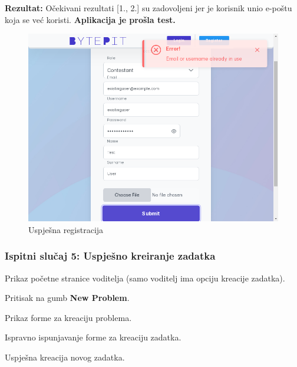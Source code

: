 			\noindent \textbf{Rezultat:} Očekivani rezultati [1., 2.] su zadovoljeni jer je korisnik unio e-poštu koja se već koristi. \textbf{Aplikacija je prošla test.}
			
			\begin{figure}[H]
				\includegraphics[scale=0.50]{slike/registration_already_exists_test_result.PNG}
				\centering
				\caption{Uspješna registracija}
				\label{fig:failed_register}
			\end{figure}
			
			\eject
			
			\subsubsection{Ispitni slučaj 5: Uspješno kreiranje zadatka}
			
			
			\begin{packed_enum}
				
				\item  Prikaz početne stranice voditelja (samo voditelj ima opciju kreacije zadatka).
				\item  Pritisak na gumb \textbf{New Problem}.
				\item  Prikaz forme za kreaciju problema.
				\item  Ispravno ispunjavanje forme za kreaciju zadatka.
				
			\end{packed_enum}
			
			\begin{packed_enum}
				
				\item  Uspješna kreacija novog zadatka.
				
			\end{packed_enum}
			
